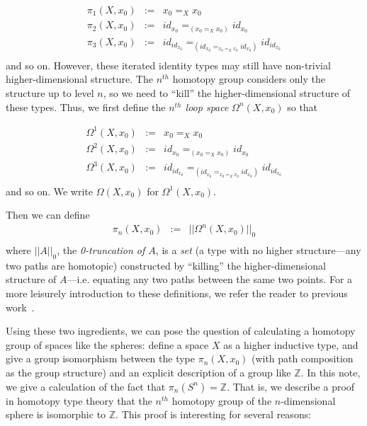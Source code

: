 \[
\begin{array}{rcl}
\pi_1(X,x_0) & := & x_0 =_X x_0 \\
\pi_2(X,x_0) & := & id_{{x_0}} =_{{(x_0 =_X x_0)}} id_{{x_0}} \\
\pi_3(X,x_0) & := & id_{{id_{x_0}}} =_{(id_{{x_0}} =_{{x_0 =_X x_0}} id_{{x_0}})} id_{{id_{x_0}}} \\
\end{array}
\]
and so on.  However, these iterated identity types may still have
non-trivial higher-dimensional structure.  The $n^{th}$ homotopy group
considers only the structure up to level $n$, so we need to ``kill'' the
higher-dimensional structure of these types.  Thus, we first define the
\emph{$n^{th}$ loop space} $\Omega^n(X,x_0)$ so that

\[
\begin{array}{rcl}
\Omega^1(X,x_0) & := & x_0 =_X x_0 \\
\Omega^2(X,x_0) & := & id_{{x_0}} =_{{(x_0 =_X x_0)}} id_{{x_0}} \\
\Omega^3(X,x_0) & := & id_{{id_{x_0}}} =_{(id_{{x_0}} =_{{x_0 =_X x_0}} id_{{x_0}})} id_{{id_{x_0}}} \\
\end{array}
\]
and so on.  We write $\Omega(X,x_0)$ for $\Omega^1(X,x_0)$.  

Then we can define 
\[
\begin{array}{rcl}
\pi_n(X,x_0) & := & ||\Omega^n(X,x_0)||_0 \\
\end{array}
\]
where $||A||_0$, the \emph{0-truncation of $A$}, is a \emph{set} (a type
with no higher structure---any two paths are homotopic) constructed by
``killing'' the higher-dimensional structure of $A$---i.e. equating any
two paths between the same two points.  For a more leisurely
introduction to these definitions, we refer the reader to previous work~\citep{ls13pi1s1,uf13hott-book}.

Using these two ingredients, we can pose the question of calculating a
homotopy group of spaces like the spheres:
define a space $X$ as a
higher inductive type, and give
a group isomorphism between the type $\pi_n(X,x_0)$ (with path
composition as the group structure) and an explicit description of a
group like $\mathbb{Z}$.  In this note, we give a calculation of the
fact that $\pi_n(S^n) = \mathbb{Z}$. That is, we describe a proof in
homotopy type theory that the $n^{th}$ homotopy group of the
$n$-dimensional sphere is isomorphic to $\mathbb{Z}$.  This proof is
interesting for several reasons:

